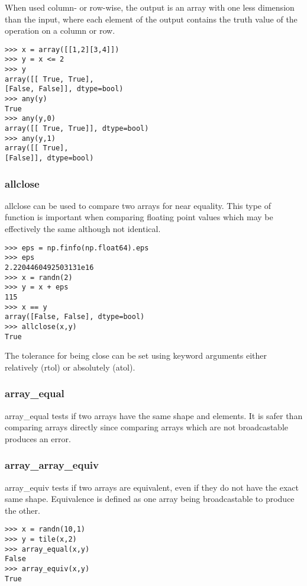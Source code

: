 \documentclass[KSmain.tex]{subfiles}
\begin{document}
When used column- or row-wise, the output is an array with one less dimension than the input, where each element
of the output contains the truth value of the operation on a column or row.
\begin{framed}
\begin{verbatim}
>>> x = array([[1,2][3,4]])
>>> y = x <= 2
>>> y
array([[ True, True],
[False, False]], dtype=bool)
>>> any(y)
True
>>> any(y,0)
array([[ True, True]], dtype=bool)
>>> any(y,1)
array([[ True],
[False]], dtype=bool)
\end{verbatim}
\end{framed}

\subsubsection{allclose}
allclose can be used to compare two arrays for near equality. This type of function is important when
comparing floating point values which may be effectively the same although not identical.
\begin{framed}
\begin{verbatim}
>>> eps = np.finfo(np.float64).eps
>>> eps
2.2204460492503131e16
>>> x = randn(2)
>>> y = x + eps
115
>>> x == y
array([False, False], dtype=bool)
>>> allclose(x,y)
True
\end{verbatim}
\end{framed}
The tolerance for being close can be set using keyword arguments either relatively (rtol) or absolutely
(atol).

\subsubsection{array\_equal}
array\_equal tests if two arrays have the same shape and elements. It is safer than comparing arrays directly
since comparing arrays which are not broadcastable produces an error.
\subsubsection{array\_array\_equiv}
array\_equiv tests if two arrays are equivalent, even if they do not have the exact same shape. Equivalence
is defined as one array being broadcastable to produce the other.
\begin{framed}
\begin{verbatim}>>> x = randn(10,1)
>>> y = tile(x,2)
>>> array_equal(x,y)
False
>>> array_equiv(x,y)
True
\end{verbatim}
\end{framed}
\end{document}
